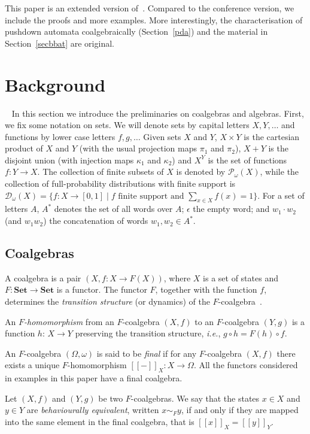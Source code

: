 \documentclass{LMCS}
\def\pow#1{{\mathcal P_\omega}#1}
\newcommand{\bb}[1]{[\![ #1 ]\!]}
\begin{document}
This paper is an extended version of~\cite{FSTTCS}. Compared to the conference version, we include the proofs and more examples. More interestingly, the characterisation of pushdown automata coalgebraically (Section~\ref{pda}) and the
material in Section~\ref{secbbat} are original.



\section{Background}~\label{sec:prelim}
In this section we introduce the preliminaries on coalgebras and
algebras. First, we fix some notation on sets. We will denote sets
by capital letters $X,Y,\ldots$ and functions by lower case letters
$f,g,\dots$ Given sets $X$ and $Y$, $X\times Y$ is the cartesian
product of $X$ and $Y$ (with the usual projection maps $\pi_1$ and
$\pi_2$), $X+Y$ is the disjoint union (with injection maps
$\kappa_1$ and $\kappa_2$) and $X^Y$ is the set of functions $f\colon Y\to
X$. The collection of finite subsets of $X$ is denoted by $\pow
(X)$, while the collection of full-probability distributions with finite
support is $\mathcal D_\omega (X)
= \{f\colon X\to [0,1] \mid \text{$f$ finite support and } \sum_{x\in X} f(x) = 1\}$. For a set of letters
$A$, $A^*$ denotes the set of all words over $A$; $\epsilon$ the
empty word; and $w_1\cdot w_2$ (and $w_1w_2$) the concatenation of
words $w_1,w_2 \in A^*$.

\subsection{Coalgebras} A coalgebra is a pair $(X, f\colon
X\to F(X))$, where $X$ is a set of states and $F\colon
\mathbf{Set}\to \mathbf{Set}$ is a functor.
 The functor $F$, together with the
function $f$, determines the {\em transition structure} (or
dynamics) of the $F$-coalgebra~\cite{Rutten00}.

An {\em $F$-homomorphism\/} from an $F$-coalgebra $(X,f)$ to an
$F$-coalgebra $(Y,g)$ is a function $h\colon \, X \to Y$ preserving the
transition structure, {\em i.e.}, $g\circ h = F(h) \circ f$.

An $F$-coalgebra $(\Omega,\omega)$ is said to be {\em final} if for
any $F$-coalgebra $(X,f)$ there exists a unique $F$-homomorphism
 $\bb{-}_X\colon X\to \Omega$.
 All the functors considered in examples in this paper have a final coalgebra.

Let $(X, f)$ and $(Y,g)$ be two $F$-coalgebras. We say that the
states $x\in X$ and $y\in Y$ are {\em behaviourally equivalent},
written $x\sim_F y$, if and only if they are mapped into the same
element in the final coalgebra, that is $\bb{x}_X =
\bb{y}_Y$.
\end{document}
